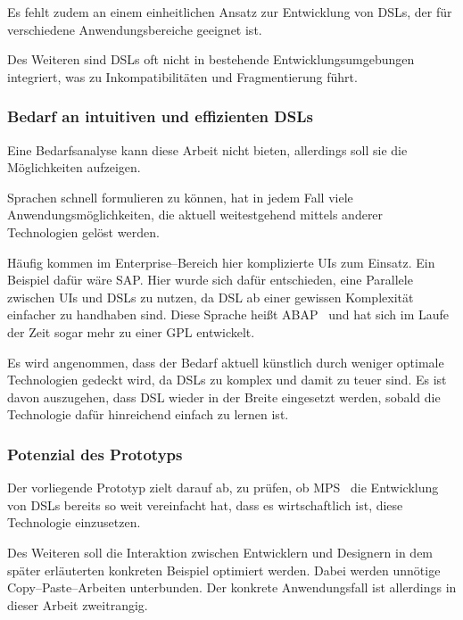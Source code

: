 Es fehlt zudem an einem einheitlichen Ansatz zur Entwicklung von \acp{DSL}, der für verschiedene Anwendungsbereiche geeignet ist.

Des Weiteren sind \acp{DSL} oft nicht in bestehende Entwicklungsumgebungen integriert, was zu Inkompatibilitäten und Fragmentierung führt.

\subsubsection{Bedarf an intuitiven und effizienten \aclp{DSL}}
Eine Bedarfsanalyse kann diese Arbeit nicht bieten, allerdings soll sie die Möglichkeiten aufzeigen.

Sprachen schnell formulieren zu können, hat in jedem Fall viele Anwendungsmöglichkeiten, die aktuell weitestgehend mittels anderer Technologien gelöst werden.

Häufig kommen im Enterprise--Bereich hier komplizierte \acp{UI} zum Einsatz.
Ein Beispiel dafür wäre SAP\@.
Hier wurde sich dafür entschieden, eine Parallele zwischen \acp{UI} und \acp{DSL} zu nutzen, da \ac{DSL} ab einer gewissen Komplexität einfacher zu handhaben sind.
Diese Sprache heißt ABAP~\autocite{sap-se-no-date} und hat sich im Laufe der Zeit sogar mehr zu einer \ac{GPL} entwickelt.

Es wird angenommen, dass der Bedarf aktuell künstlich durch weniger optimale Technologien gedeckt wird, da \acp{DSL} zu komplex und damit zu teuer sind.
Es ist davon auszugehen, dass \ac{DSL} wieder in der Breite eingesetzt werden, sobald die Technologie dafür hinreichend einfach zu lernen ist.

\subsubsection{Potenzial des Prototyps}
Der vorliegende Prototyp zielt darauf ab, zu prüfen, ob \ac{MPS}~\autocite{jetbrains-sro-2021} die Entwicklung von \acp{DSL} bereits so weit vereinfacht hat, dass es wirtschaftlich ist, diese Technologie einzusetzen.

Des Weiteren soll die Interaktion zwischen Entwicklern und Designern in dem später erläuterten konkreten Beispiel optimiert werden.
Dabei werden unnötige Copy--Paste--Arbeiten unterbunden.
Der konkrete Anwendungsfall ist allerdings in dieser Arbeit zweitrangig.

